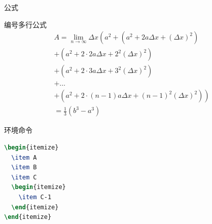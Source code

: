 \documentclass{CAUBeamer}
\begin{document}
\begin{frame}{公式}
    \begin{exampleblock}{编号多行公式}
        \begin{multline}
            A=\lim_{n\rightarrow\infty}\Delta x\left(a^{2}+\left(a^{2}+2a\Delta x+\left(\Delta x\right)^{2}\right)\right.\label{eq:reset}\\
            +\left(a^{2}+2\cdot2a\Delta x+2^{2}\left(\Delta x\right)^{2}\right)\\
            +\left(a^{2}+2\cdot3a\Delta x+3^{2}\left(\Delta x\right)^{2}\right)\\
            +\ldots\\
            \left.+\left(a^{2}+2\cdot(n-1)a\Delta x+(n-1)^{2}\left(\Delta x\right)^{2}\right)\right)\\
            =\frac{1}{3}\left(b^{3}-a^{3}\right)
        \end{multline}
    \end{exampleblock}
\end{frame}
\begin{frame}[fragile]{环境命令}
        \begin{lstlisting}[language=TeX]
\begin{itemize}
  \item A 
  \item B
  \item C
  \begin{itemize}
    \item C-1
  \end{itemize}
\end{itemize}
        \end{lstlisting}
\end{frame}
\end{document}
